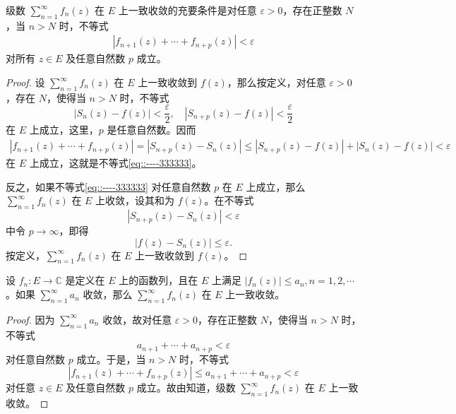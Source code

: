 \documentclass[../../main.tex]{subfiles}
\begin{document}
\begin{theorem}\label{theorem:定理4.1.2}
级数 \( \sum_{n=1}^{\infty} f_n(z) \) 在 \( E \) 上一致收敛的充要条件是对任意 \( \varepsilon > 0 \)，存在正整数 \( N \)，当 \( n > N \) 时，不等式
\begin{align}
|f_{n + 1}(z) + \cdots + f_{n + p}(z)| < \varepsilon\label{eq::----333333}
\end{align}
对所有 \( z \in E \) 及任意自然数 \( p \) 成立。
\end{theorem}
\begin{proof}
设 \( \sum_{n=1}^{\infty} f_n(z) \) 在 \( E \) 上一致收敛到 \( f(z) \)，那么按定义，对任意 \( \varepsilon > 0 \)，存在 \( N \)，使得当 \( n > N \) 时，不等式
\[
|S_n(z) - f(z)| < \frac{\varepsilon}{2},
\quad
|S_{n + p}(z) - f(z)| < \frac{\varepsilon}{2}
\]
在 \( E \) 上成立，这里，\( p \) 是任意自然数。因而
\begin{align*}
|f_{n + 1}(z) + \cdots + f_{n + p}(z)| = |S_{n + p}(z) - S_n(z)| \leqslant |S_{n + p}(z) - f(z)| + |S_n(z) - f(z)| < \varepsilon
\end{align*}
在 \( E \) 上成立，这就是不等式\eqref{eq::----333333}。

反之，如果不等式\eqref{eq::----333333} 对任意自然数 \( p \) 在 \( E \) 上成立，那么 \( \sum_{n=1}^{\infty} f_n(z) \) 在 \( E \) 上收敛，设其和为 \( f(z) \)。在不等式
\[
|S_{n + p}(z) - S_n(z)| < \varepsilon
\]
中令 \( p \to \infty \)，即得
\[
|f(z) - S_n(z)| \leqslant \varepsilon.
\]
按定义，\( \sum_{n=1}^{\infty} f_n(z) \) 在 \( E \) 上一致收敛到 \( f(z) \)。
\end{proof}

\begin{theorem}[Weierstrass一致收敛判别法]\label{theorem:Weierstrass一致收敛判别法}
设 \( f_n: E \to \mathbb{C} \) 是定义在 \( E \) 上的函数列，且在 \( E \) 上满足 \( |f_n(z)| \leqslant a_n, n = 1, 2, \cdots \)。如果 \( \sum_{n=1}^{\infty} a_n \) 收敛，那么 \( \sum_{n=1}^{\infty} f_n(z) \) 在 \( E \) 上一致收敛。
\end{theorem}
\begin{proof}
因为 \( \sum_{n=1}^{\infty} a_n \) 收敛，故对任意 \( \varepsilon > 0 \)，存在正整数 \( N \)，使得当 \( n > N \) 时，不等式
\[
a_{n + 1} + \cdots + a_{n + p} < \varepsilon
\]
对任意自然数 \( p \) 成立。于是，当 \( n > N \) 时，不等式
\[
|f_{n + 1}(z) + \cdots + f_{n + p}(z)| \leqslant a_{n + 1} + \cdots + a_{n + p}
< \varepsilon
\]
对任意 \( z \in E \) 及任意自然数 \( p \) 成立。故由知道，级数 \( \sum_{n=1}^{\infty} f_n(z) \) 在 \( E \) 上一致收敛。
\end{proof}
\end{document}
